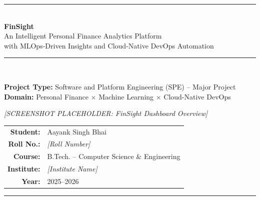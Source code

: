 \documentclass[12pt,a4paper]{report}
\begin{document}
\begin{titlepage}
  \centering
  \vspace*{1.5cm}

  {\color{primary}\rule{\linewidth}{1.5pt}}\\[0.4cm]
  {\Huge\bfseries\color{primary} FinSight}\\[0.3cm]
  {\Large\color{accent} An Intelligent Personal Finance Analytics Platform}\\[0.2cm]
  {\large\color{primary} with MLOps-Driven Insights and Cloud-Native DevOps Automation}\\[0.1cm]
  {\color{primary}\rule{\linewidth}{1.5pt}}\\[1cm]

  \begin{tcolorbox}[enhanced, colback=lightblue, colframe=accent, width=0.85\linewidth, arc=6pt]
    \centering
    \textbf{Project Type:} Software and Platform Engineering (SPE) -- Major Project\\[4pt]
    \textbf{Domain:} Personal Finance $\times$ Machine Learning $\times$ Cloud-Native DevOps
  \end{tcolorbox}

  \vspace{1.5cm}

  \begin{tcolorbox}[enhanced, colback=gray!10, colframe=gray!50, width=0.9\linewidth,
      height=6cm, arc=6pt, valign=center, halign=center]
    \textcolor{gray!70}{\large\textit{[SCREENSHOT PLACEHOLDER: FinSight Dashboard Overview]}}
  \end{tcolorbox}

  \vfill

  \begin{tabular}{rl}
    \textbf{Student:}   & Aayank Singh Bhai \\[4pt]
    \textbf{Roll No.:}  & \textit{[Roll Number]} \\[4pt]
    \textbf{Course:}    & B.Tech. -- Computer Science \& Engineering \\[4pt]
    \textbf{Institute:} & \textit{[Institute Name]} \\[4pt]
    \textbf{Year:}      & 2025--2026 \\
  \end{tabular}

  \vspace{1cm}
  {\color{primary}\rule{\linewidth}{0.8pt}}
\end{titlepage}
\end{document}
